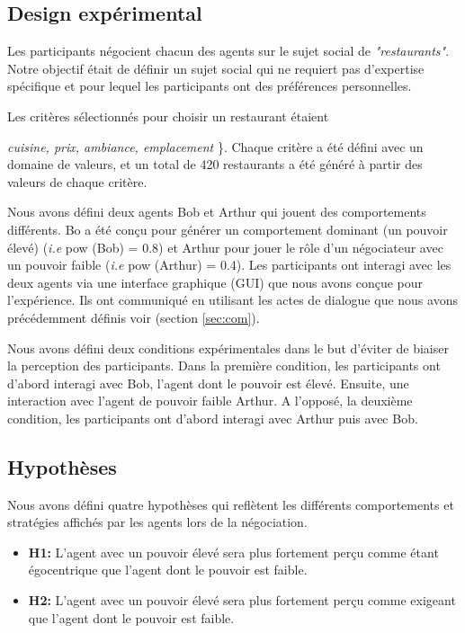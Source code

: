 \documentclass [french]{sig-alternate-05-2015}
\begin{document}
			\subsection{Design expérimental}
			
			Les participants négocient chacun des agents sur le sujet social de \emph {"restaurants"}. Notre objectif était de définir un sujet social qui ne requiert pas d'expertise spécifique et pour lequel les participants ont des préférences personnelles.
			
			Les critères sélectionnés pour choisir un restaurant étaient \ {\textit {cuisine, prix, ambiance, emplacement} \}. Chaque critère a été défini avec un domaine de valeurs, et un total de 420 restaurants a été généré à partir des valeurs de chaque critère.
				
			Nous avons défini deux agents Bob et Arthur qui jouent des comportements différents. Bo a été conçu pour générer un comportement dominant (un pouvoir élevé) (\textit {i.e} pow (Bob) = 0.8) et Arthur pour jouer le rôle d'un négociateur avec un pouvoir faible (\textit {i.e} pow (Arthur) = 0.4).
			Les participants ont interagi avec les deux agents via une interface graphique (GUI) que nous avons conçue pour l'expérience. Ils ont communiqué en utilisant les actes de dialogue que nous avons précédemment définis voir (section \ref {sec:com}).

						
			Nous avons défini deux conditions expérimentales dans le but d'éviter de biaiser la perception des participants. Dans la première condition, les participants ont d'abord interagi avec Bob, l'agent dont le pouvoir est élevé. Ensuite, une interaction avec l'agent de pouvoir faible Arthur.
			A l'opposé, la deuxième condition, les participants ont d'abord interagi  avec Arthur puis avec Bob.
			
			\subsection {Hypothèses}
			\label{sec:hyp}
			Nous avons défini quatre hypothèses qui reflètent les différents comportements et stratégies affichés par les agents lors de la négociation.
			
			\begin{itemize}
				\item \textbf {H1:} L'agent avec un pouvoir élevé sera plus fortement perçu comme étant égocentrique que l'agent dont le pouvoir est faible.
				
				\item \textbf {H2:} L'agent avec un pouvoir élevé sera plus fortement perçu comme exigeant que l'agent dont le pouvoir est faible.
				

\end{itemize}}
\end{document}
